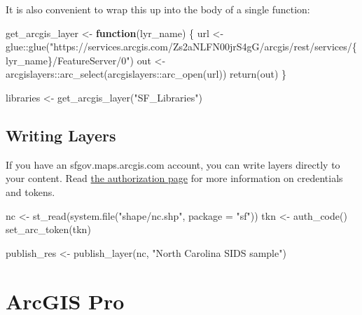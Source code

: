 \documentclass[
  letterpaper,
  DIV=11,
  numbers=noendperiod]{scrreprt}
\newenvironment{Shaded}{\begin{snugshade}}{\end{snugshade}}
\newcommand{\AttributeTok}[1]{\textcolor[rgb]{0.40,0.45,0.13}{#1}}
\newcommand{\ControlFlowTok}[1]{\textcolor[rgb]{0.00,0.23,0.31}{\textbf{#1}}}
\newcommand{\FunctionTok}[1]{\textcolor[rgb]{0.28,0.35,0.67}{#1}}
\newcommand{\NormalTok}[1]{\textcolor[rgb]{0.00,0.23,0.31}{#1}}
\newcommand{\OtherTok}[1]{\textcolor[rgb]{0.00,0.23,0.31}{#1}}
\newcommand{\SpecialCharTok}[1]{\textcolor[rgb]{0.37,0.37,0.37}{#1}}
\newcommand{\StringTok}[1]{\textcolor[rgb]{0.13,0.47,0.30}{#1}}
\begin{document}
It is also convenient to wrap this up into the body of a single
function:

\begin{Shaded}
\begin{Highlighting}[]
\NormalTok{get\_arcgis\_layer }\OtherTok{\textless{}{-}} \ControlFlowTok{function}\NormalTok{(lyr\_name) \{}
\NormalTok{  url }\OtherTok{\textless{}{-}}\NormalTok{ glue}\SpecialCharTok{::}\FunctionTok{glue}\NormalTok{(}\StringTok{"https://services.arcgis.com/Zs2aNLFN00jrS4gG/arcgis/rest/services/\{lyr\_name\}/FeatureServer/0"}\NormalTok{)}
\NormalTok{  out }\OtherTok{\textless{}{-}}\NormalTok{ arcgislayers}\SpecialCharTok{::}\FunctionTok{arc\_select}\NormalTok{(arcgislayers}\SpecialCharTok{::}\FunctionTok{arc\_open}\NormalTok{(url))}
  \FunctionTok{return}\NormalTok{(out)}
\NormalTok{\}}

\NormalTok{libraries }\OtherTok{\textless{}{-}} \FunctionTok{get\_arcgis\_layer}\NormalTok{(}\StringTok{"SF\_Libraries"}\NormalTok{)}
\end{Highlighting}
\end{Shaded}

\subsection{Writing Layers}\label{writing-layers}

If you have an sfgov.maps.arcgis.com account, you can write layers
directly to your content. Read
\href{https://r.esri.com/r-bridge-site/location-services/connecting-to-a-portal.html}{the
authorization page} for more information on credentials and tokens.

\begin{Shaded}
\begin{Highlighting}[]
\NormalTok{nc }\OtherTok{\textless{}{-}} \FunctionTok{st\_read}\NormalTok{(}\FunctionTok{system.file}\NormalTok{(}\StringTok{"shape/nc.shp"}\NormalTok{, }\AttributeTok{package =} \StringTok{"sf"}\NormalTok{))}
\NormalTok{tkn }\OtherTok{\textless{}{-}} \FunctionTok{auth\_code}\NormalTok{()}
\FunctionTok{set\_arc\_token}\NormalTok{(tkn)}

\NormalTok{publish\_res }\OtherTok{\textless{}{-}} \FunctionTok{publish\_layer}\NormalTok{(nc, }\StringTok{"North Carolina SIDS sample"}\NormalTok{)}
\end{Highlighting}
\end{Shaded}

\section{ArcGIS Pro}\label{arcgis-pro}
\end{document}
